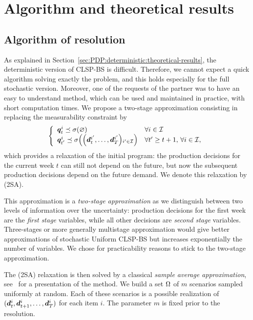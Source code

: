 \section{Algorithm and theoretical results}


\subsection{Algorithm of resolution}



As explained in Section~\ref{sec:PDP:deterministic:theoretical-results}, the deterministic version of CLSP-BS is difficult.
Therefore, we cannot expect a quick algorithm solving exactly the problem, and this holds especially for the full stochastic version.
Moreover, one of the requests of the partner was to have an easy to understand method, which can be used and maintained in practice, with short computation times.
We propose a two-stage approximation consisting in replacing the measurability constraint by
\begin{equation}
\left\{
\begin{array}{l@{\quad}l}
\va\quantity_{t}^i \preceq \Sfield{\varnothing} & \forall i\in\REF
\\
\va\quantity_{t'}^i \preceq \Sfield{\bracket{\va\demand_t^{i'},\ldots,\va\demand_{\horizon}^{i'}}_{i'\in\REF}} & \forall t'\geq t+1,\, \forall i\in\REF,
\end{array}
\right.
\end{equation}
which provides a relaxation of the initial program: the production decisions for the current week $t$ can still not depend on the future, but now the subsequent production decisions depend on the future demand. We denote this relaxation by (2SA).

This approximation is a \emph{two-stage approximation} as we distinguish between two levels of information over the uncertainty: production decisions for the first week are the \emph{first stage} variables, while all other decisions are \emph{second stage} variables.
Three-stages or more generally multistage approximation would give better approximations of stochastic Uniform CLSP-BS but increases exponentially the number of variables. We chose for practicability reasons to stick to the two-stage approximation.

The (2SA) relaxation is then solved by a classical {\em sample average approximation}, see~\cite{Kleywegt2002} for a presentation of the method.
We build a set $\Omega$ of $m$ scenarios sampled uniformly at random.
Each of these scenarios is a possible realization of $(\va\demand_t^i,\va\demand_{t+1}^i,\ldots,\va\demand_{\horizon}^i)$ for each item $i$. The parameter $m$ is fixed prior to the resolution.

